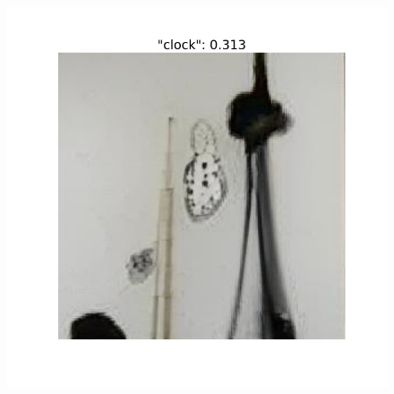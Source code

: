 \documentclass[11pt,a4paper,openany]{book}
\begin{document}
\begin{figure}[!htb]
\endminipage\hfill
{}
  \includegraphics[width=\linewidth]{figs/clock_cossim.png}
\endminipage
\end{figure}
\end{document}

